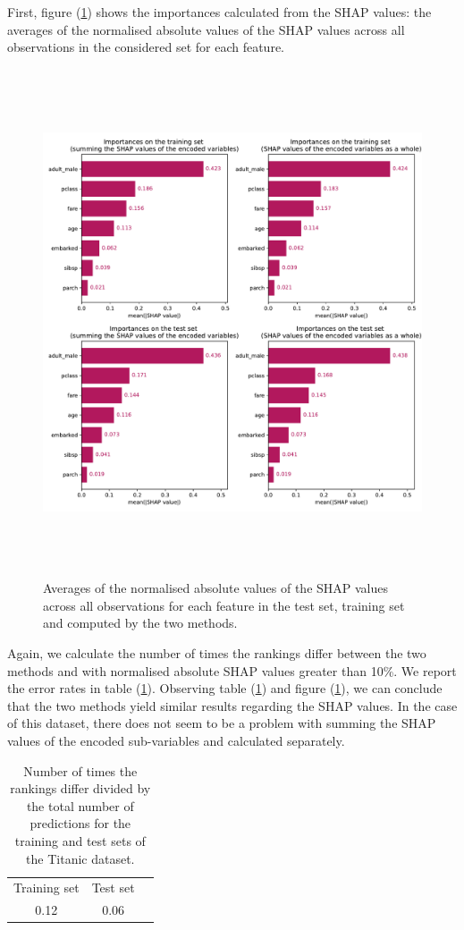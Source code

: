 \documentclass[11pt]{article}
\begin{document}
First, figure (\ref{fig:importances_shap}) shows the importances calculated from the SHAP values:
the averages of the normalised absolute values of the SHAP values across all observations 
in the considered set for each feature.

\begin{figure}[H]
    \centering
    \includegraphics[height=15cm]{"../outputs/comparison-shap/figures/titanic_importances.pdf"}
    \caption{Averages of the normalised absolute values of the SHAP values across all observations 
    for each feature in the test set, training set and computed by the two methods.}
    \label{fig:importances_shap}
\end{figure}

Again, we calculate the number of times the rankings differ between the two methods and with normalised
absolute SHAP values greater than 10\%. We report the error rates in table (\ref{table:rankings_titanic}). 
Observing table (\ref{table:rankings_titanic}) and figure (\ref{fig:importances_shap}), we can conclude 
that the two methods  yield similar results regarding the SHAP values. In the case of this dataset, there 
does not seem to be a problem with summing the SHAP values of the encoded sub-variables and calculated
separately.
\begin{table}[H]
    \centering
    \begin{tabular}{ccc}
      \midrule
      Training set & Test set \\
      0.12 &  0.06 \\
      \bottomrule
    \end{tabular}
    \caption{Number of times the rankings differ divided by the total number of
    predictions for the training and test sets of the Titanic dataset.}
    \label{table:rankings_titanic}
\end{table}
\end{document}
